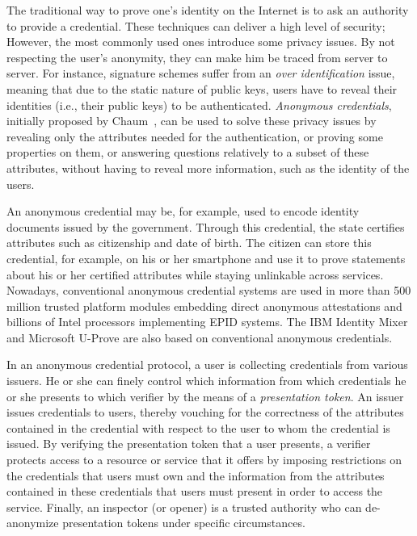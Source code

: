  The traditional way to 
prove one's identity on the Internet is to ask an authority to provide a 
credential. These techniques can deliver a high level of security; 
However, the most commonly used ones introduce some privacy issues. By not 
respecting the user's anonymity, they can make him be traced from server 
to server. For instance, signature schemes suffer from an \emph{over 
identification} issue, meaning that due to the static nature of public 
keys, users have to reveal their identities (i.e., their public keys) to 
be authenticated. \emph{Anonymous credentials}, initially proposed by 
Chaum~\cite{DBLP:journals/cacm/Chaum85}, can be used to solve these 
privacy issues by revealing only the attributes needed for the 
authentication, or proving some properties on them, or answering 
questions relatively to a subset of these attributes, without having to 
reveal more information, such as the identity of the users.


An anonymous credential may be, for example, used to encode identity 
documents issued by the government. Through this credential, the state 
certifies attributes such as citizenship and date of birth. The citizen 
can store this credential, for example, on his or her smartphone and use 
it to prove statements about his or her certified attributes while 
staying unlinkable across services. Nowadays, conventional anonymous 
credential systems are used in more than 500 million trusted platform 
modules embedding direct anonymous attestations and billions of Intel 
processors implementing EPID systems. The IBM Identity Mixer and 
Microsoft U-Prove are also based on conventional anonymous credentials.

In an anonymous credential protocol, a user is collecting credentials 
from various issuers. He or she can finely control which information 
from which credentials he or she presents to which verifier by the means 
of a \emph{presentation token}. 
	An issuer issues credentials to users, thereby vouching for the 
correctness of the attributes contained in the credential with respect 
to the user to whom the credential is issued.
	By verifying the presentation token that a user presents, a 
verifier protects access to a resource or service that it offers by 
imposing restrictions on the credentials that users must own and the 
information from the attributes contained in these credentials that 
users must present in order to access the service. Finally, an inspector 
(or opener) is a trusted authority who can de-anonymize presentation 
tokens under specific circumstances.

